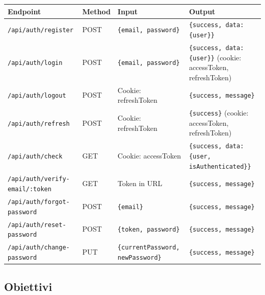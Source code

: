 \documentclass[11pt,a4paper]{article}
\begin{document}
\begin{longtable}{|p{3cm}|p{2cm}|p{4cm}|p{6cm}|}
\hline
\textbf{Endpoint} & \textbf{Method} & \textbf{Input} & \textbf{Output} \\
\hline
\endhead
\hline
\endfoot
\hline
\endlastfoot
\texttt{/api/auth/register} & POST & \texttt{\{email, password\}} & \texttt{\{success, data: \{user\}\}} \\
\texttt{/api/auth/login} & POST & \texttt{\{email, password\}} & \texttt{\{success, data: \{user\}\}} (cookie: accessToken, refreshToken) \\
\texttt{/api/auth/logout} & POST & Cookie: refreshToken & \texttt{\{success, message\}} \\
\texttt{/api/auth/refresh} & POST & Cookie: refreshToken & \texttt{\{success\}} (cookie: accessToken, refreshToken) \\
\texttt{/api/auth/check} & GET & Cookie: accessToken & \texttt{\{success, data: \{user, isAuthenticated\}\}} \\
\texttt{/api/auth/verify-email/:token} & GET & Token in URL & \texttt{\{success, message\}} \\
\texttt{/api/auth/forgot-password} & POST & \texttt{\{email\}} & \texttt{\{success, message\}} \\
\texttt{/api/auth/reset-password} & POST & \texttt{\{token, password\}} & \texttt{\{success, message\}} \\
\texttt{/api/auth/change-password} & PUT & \texttt{\{currentPassword, newPassword\}} & \texttt{\{success, message\}} \\
\hline
\end{longtable}

\subsection{Obiettivi}
\end{document}
